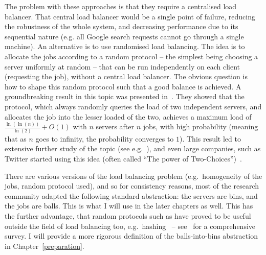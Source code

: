 The problem with these approaches is that they require a centralised load balancer. That central load balancer would be a single point of failure, reducing the robustness of the whole system, and decreasing performance due to its sequential nature (e.g. all Google search requests cannot go through a single machine). An alternative is to use randomised load balancing. The idea is to allocate the jobs according to a random protocol -- the simplest being choosing a server uniformly at random -- that can be run independently on each client (requesting the job), without a central load balancer. The obvious question is how to shape this random protocol such that a good balance is achieved. A groundbreaking result in this topic was presented in~\cite{azar1999twochoice}. They showed that the \TwoChoice protocol, which always randomly queries the load of two independent servers, and allocates the job into the lesser loaded of the two, achieves a maximum load of $\frac{\ln(\ln(n))}{\ln(2)} + O(1)$ with $n$ servers after $n$ jobs, with high probability (meaning that as $n$ goes to infinity, the probability converges to $1$). This result led to extensive further study of the topic (see e.g.~\cite{richa2001surveytwochoice}), and even large companies, such as Twitter started using this idea (often called ``The power of Two-Choices'')~\cite{anderson2019twitter}.


There are various versions of the load balancing problem (e.g.\ homogeneity of the jobs, random protocol used), and so for consistency reasons, most of the research community adapted the following standard abstraction: the servers are bins, and the jobs are balls. This is what I will use in the later chapters as well. This has the further advantage, that random protocols such as \TwoChoice have proved to be useful outside the field of load balancing too, e.g.\ hashing~\cite{azar1999twochoice} -- see~\cite{wieder2017ballsintobinslandscape} for a comprehensive survey. I will provide a more rigorous definition of the balls-into-bins abstraction in Chapter~\ref{preparation}.

